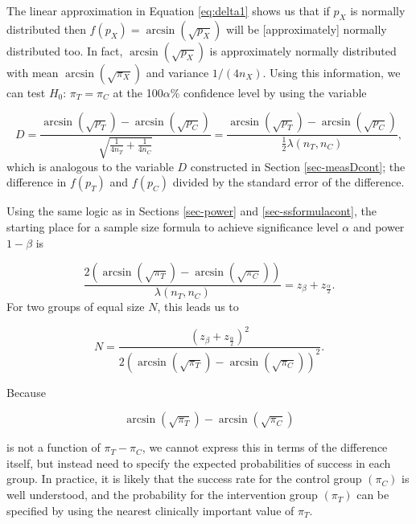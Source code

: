 \documentclass[
  openany]{book}
\theoremstyle{definition}
\theoremstyle{definition}
\theoremstyle{definition}
\theoremstyle{definition}
\theoremstyle{remark}
\begin{document}
The linear approximation in Equation \eqref{eq:delta1} shows us that if \(p_X\) is normally distributed then \(f\left(p_X\right) = \arcsin\left(\sqrt{p_X}\right)\) will be {[}approximately{]} normally distributed too. In fact, \(\arcsin\left(\sqrt{p_X}\right)\) is approximately normally distributed with mean \(\arcsin{\left(\sqrt{\pi_X}\right)}\) and variance \(1/\left(4n_X\right)\). Using this information, we can test \(H_0:\,\pi_T =\pi_C\) at the 100\(\alpha\)\% confidence level by using the variable

\[
D =  \frac{\arcsin{\left(\sqrt{p_T}\right)} - \arcsin{\left(\sqrt{p_C}\right)}}{\sqrt{\frac{1}{4n_T} + \frac{1}{4n_C}}}=  \frac{\arcsin{\left(\sqrt{p_T}\right)} - \arcsin{\left(\sqrt{p_C}\right)}}{\frac{1}{2}\lambda\left(n_T,n_C\right)},
\]
which is analogous to the variable \(D\) constructed in Section \ref{sec-measDcont}; the difference in \(f\left(p_T\right)\) and \(f\left(p_C\right)\) divided by the standard error of the difference.

Using the same logic as in Sections \ref{sec-power} and \ref{sec-ssformulacont}, the starting place for a sample size formula to achieve significance level \(\alpha\) and power \(1-\beta\) is

\[
\frac{2\left(\arcsin{\left(\sqrt{\pi_T}\right)} - \arcsin{\left(\sqrt{\pi_C}\right)}\right)}{\lambda\left(n_T,n_C\right)} = z_\beta + z_{\frac{\alpha}{2}}.
\]
For two groups of equal size \(N\), this leads us to

\begin{equation}
N = \frac{\left(z_\beta + z_{\frac{\alpha}{2}}\right)^2}{2\left(\arcsin{\left(\sqrt{\pi_T}\right)} - \arcsin{\left(\sqrt{\pi_C}\right)}\right)^2}.
\label{eq:ssbinary}
\end{equation}

Because

\[\arcsin{\left(\sqrt{\pi_T}\right)} - \arcsin{\left(\sqrt{\pi_C}\right)}\]

is not a function of \(\pi_T - \pi_C\), we cannot express this in terms of the difference itself, but instead need to specify the expected probabilities of success in each group. In practice, it is likely that the success rate for the control group \(\left(\pi_C\right)\) is well understood, and the probability for the intervention group \(\left(\pi_T\right)\) can be specified by using the nearest clinically important value of \(\pi_T\).
\end{document}
